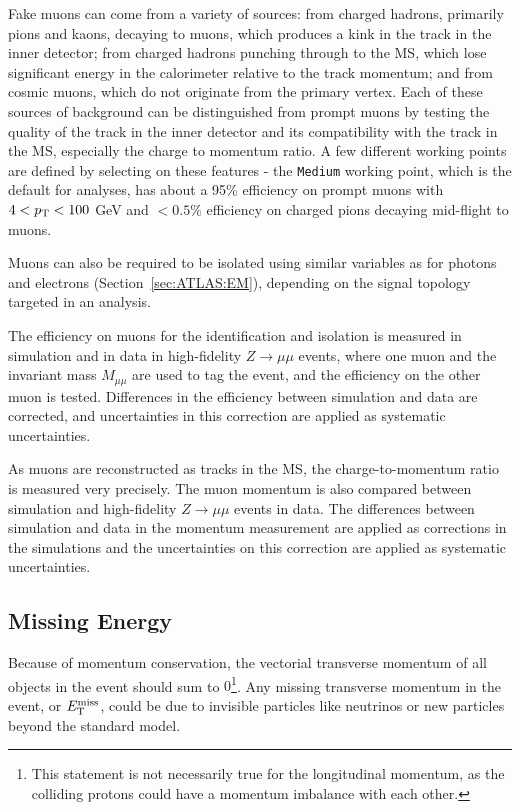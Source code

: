 Fake muons can come from a variety of sources: from charged hadrons, primarily pions and kaons, decaying to muons, which produces a kink in the track in the inner detector; from charged hadrons punching through to the MS, which lose significant energy in the calorimeter relative to the track momentum; and from cosmic muons, which do not originate from the primary vertex.
Each of these sources of background can be distinguished from prompt muons by testing the quality of the track in the inner detector and its compatibility with the track in the MS, especially the charge to momentum ratio.
A few different working points are defined by selecting on these features - the \texttt{Medium} working point, which is the default for analyses, has about a 95\% efficiency on prompt muons with $4<p_{\text{T}}<100$ GeV and $<0.5\%$ efficiency on charged pions decaying mid-flight to muons.

Muons can also be required to be isolated using similar variables as for photons and electrons (Section~\ref{sec:ATLAS:EM}), depending on the signal topology targeted in an analysis.

The efficiency on muons for the identification and isolation is measured in simulation and in data in high-fidelity $Z\rightarrow \mu\mu$ events, where one muon and the invariant mass $M_{\mu\mu}$ are used to tag the event, and the efficiency on the other muon is tested.
Differences in the efficiency between simulation and data are corrected, and uncertainties in this correction are applied as systematic uncertainties.

As muons are reconstructed as tracks in the MS, the charge-to-momentum ratio is measured very precisely.
The muon momentum is also compared between simulation and high-fidelity $Z\rightarrow \mu\mu$ events in data.
The differences between simulation and data in the momentum measurement are applied as corrections in the simulations and the uncertainties on this correction are applied as systematic uncertainties.

\subsection{Missing Energy}
\label{sec:ATLAS:met}
Because of momentum conservation, the vectorial transverse momentum of all objects in the event should sum to $0$\footnote{This statement is not necessarily true for the longitudinal momentum, as the colliding protons could have a momentum imbalance with each other.}.
Any missing transverse momentum in the event, or $E_{\text{T}}^\text{miss}$, could be due to invisible particles like neutrinos or new particles beyond the standard model.

